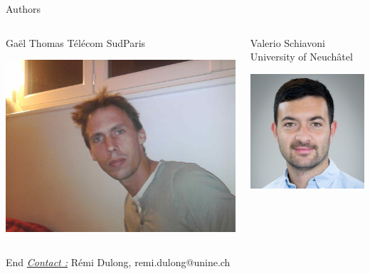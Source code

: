 \documentclass[presentation]{beamer}
\begin{document}
\begin{frame}[label={sec:orgadbd897}]{Authors}
\begin{block}{}
\begin{columns}
\begin{column}{0.2\columnwidth}
\begin{block}{Gaël Thomas}
Télécom SudParis\\
\begin{center}
\includegraphics[width=.9\linewidth]{./IMGs/gael.jpg}
\end{center}
\end{block}
\end{column}

\begin{column}{0.2\columnwidth}
\begin{block}{Valerio Schiavoni}
University of Neuchâtel\\
\begin{center}
\includegraphics[width=.9\linewidth]{./IMGs/valerio.jpg}
\end{center}
\end{block}
\end{column}
\end{columns}
\end{block}
\end{frame}

\begin{frame}[label={sec:orgd119ba7}]{End}
\uline{\emph{Contact :}} Rémi Dulong, remi.dulong@unine.ch\\
\end{frame}
\end{document}

